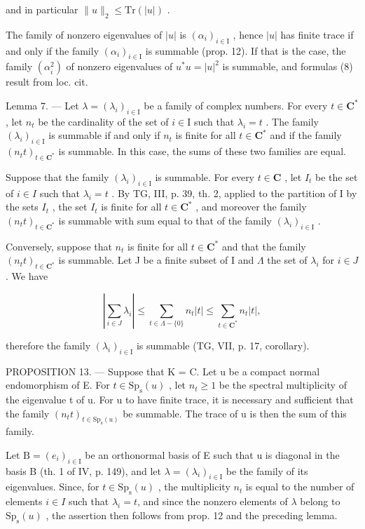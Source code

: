 and in particular \(\|u\|_{2}\leqslant\mathrm{Tr}(|u|)\) .

The family of nonzero eigenvalues of \(|u|\) is \((\alpha_{i})_{i\in \mathrm{I}}\) , hence \(|u|\) has finite trace if and only if the family \((\alpha_{i})_{i\in \mathrm{I}}\) is summable (prop. 12). If that is the case, the family \((\alpha_{i}^{2})\) of nonzero eigenvalues of \(u^{*}u = |u|^{2}\) is summable, and formulas (8) result from loc. cit.

Lemma 7. --- Let \(\lambda = (\lambda_i)_{i \in \mathrm{I}}\) be a family of complex numbers. For every \(t \in \mathbf{C}^*\) , let \(n_t\) be the cardinality of the set of \(i \in \mathrm{I}\) such that \(\lambda_i = t\) . The family \((\lambda_i)_{i \in \mathrm{I}}\) is summable if and only if \(n_t\) is finite for all \(t \in \mathbf{C}^*\) and if the family \((n_t t)_{t \in \mathbf{C}^*}\) is summable. In this case, the sums of these two families are equal.

Suppose that the family \((\lambda_{i})_{i\in\mathrm{I}}\) is summable. For every \(t\in\mathbf{C}\) , let \(I_{t}\) be the set of \(i\in I\) such that \(\lambda_{i}=t\) . By TG, III, p. 39, th. 2, applied to the partition of I by the sets \(I_{t}\) , the set \(I_{t}\) is finite for all \(t\in\mathbf{C}^{*}\) , and moreover the family \((n_{t}t)_{t\in\mathbf{C}^{*}}\) is summable with sum equal to that of the family \((\lambda_{i})_{i\in\mathrm{I}}\) .

Conversely, suppose that \(n_{t}\) is finite for all \(t \in \mathbf{C}^{*}\) and that the family \((n_{t}t)_{t \in \mathbf{C}^{*}}\) is summable. Let J be a finite subset of I and \(\Lambda\) the set of \(\lambda_{i}\) for \(i \in J\) . We have

\[
\left| \sum_ {i \in J} \lambda_ {i} \right| \leqslant \sum_ {t \in \Lambda - \{0 \}} n _ {t} | t | \leqslant \sum_ {t \in \mathbf {C} ^ {*}} n _ {t} | t |,
\]

therefore the family \((\lambda_{i})_{i\in\mathrm{I}}\) is summable (TG, VII, p. 17, corollary).

PROPOSITION 13. --- Suppose that K = C. Let u be a compact normal endomorphism of E. For \(t \in \mathrm{Sp}_{\mathrm{s}}(u)\) , let \(n_{t} \geqslant 1\) be the spectral multiplicity of the eigenvalue t of u. For u to have finite trace, it is necessary and sufficient that the family \((n_{t}t)_{t \in \mathrm{Sp}_{\mathrm{s}}(u)}\) be summable. The trace of u is then the sum of this family.

Let \(\mathrm{B} = (e_i)_{i \in \mathrm{I}}\) be an orthonormal basis of E such that u is diagonal in the basis B (th. 1 of IV, p. 149), and let \(\lambda = (\lambda_i)_{i \in \mathrm{I}}\) be the family of its eigenvalues. Since, for \(t \in \mathrm{Sp}_\mathrm{s}(u)\) , the multiplicity \(n_t\) is equal to the number of elements \(i \in I\) such that \(\lambda_i = t\), and since the nonzero elements of \(\lambda\) belong to \(\mathrm{Sp}_{\mathrm{s}}(u)\) , the assertion then follows from prop. 12 and the preceding lemma.

